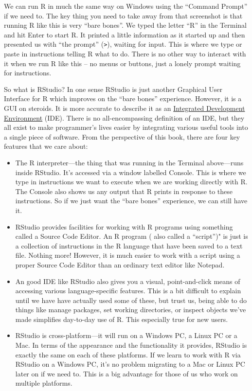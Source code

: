 \documentclass[
]{book}
\begin{document}
We can run R in much the same way on Windows using the ``Command Prompt'' if we need to. The key thing you need to take away from that screenshot is that running R like this is very ``bare bones''. We typed the letter ``R'' in the Terminal and hit Enter to start R. It printed a little information as it started up and then presented us with ``the prompt'' (\texttt{\textgreater{}}), waiting for input. This is where we type or paste in instructions telling R what to do. There is no other way to interact with it when we run R like this -- no menus or buttons, just a lonely prompt waiting for instructions.

So what is RStudio? In one sense RStudio is just another Graphical User Interface for R which improves on the ``bare bones'' experience. However, it is a GUI on steroids. It is more accurate to describe it as an \href{http://en.wikipedia.org/wiki/Integrated_development_environment}{Integrated Development Environment} (IDE). There is no all-encompassing definition of an IDE, but they all exist to make programmer's lives easier by integrating various useful tools into a single piece of software. From the perspective of this book, there are four key features that we care about:

\begin{itemize}
\item
  The R interpreter---the thing that was running in the Terminal above---runs inside RStudio. It's accessed via a window labelled Console. This is where we type in instructions we want to execute when we are working directly with R. The Console also shows us any output that R prints in response to these instructions. So if we just want the ``bare bones'' experience, we can still have it.
\item
  RStudio provides facilities for working with R programs using something called a Source Code Editor. An R program ( also called a ``script'')" is just is a collection of instructions in the R language that have been saved to a text file. Nothing more! However, it is much easier to work with a script using a proper Source Code Editor than an ordinary text editor like Notepad.
\item
  An good IDE like RStudio also gives you a visual, point-and-click means of accessing various language-specific features. This is a bit difficult to explain until we have have actually used some of these, but trust us, being able to do things like manage packages, set working directories, or inspect objects we've made simplifies day-to-day use of R. This especially true for new users.
\item
  RStudio is cross-platform---it will run on a Windows PC, a Linux PC or a Mac. In terms of the appearance and the functionality it provides, RStudio is exactly the same on each of these platforms. If we learn to work with R via RStudio on a Windows PC, it's no problem migrating to a Mac or Linux PC later on if we need to. This is a big advantage for those of us who work on multiple platforms.
\end{itemize}
\end{document}
